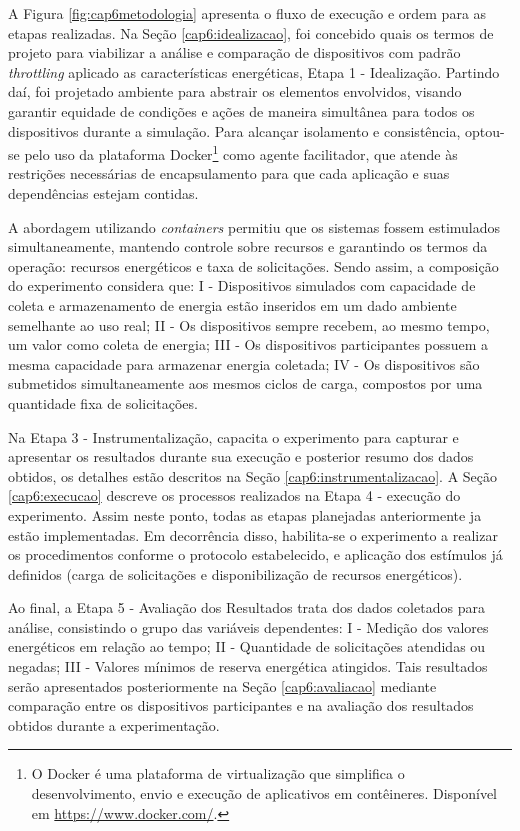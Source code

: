 A Figura \ref{fig:cap6metodologia} apresenta o fluxo de execução e ordem para as etapas realizadas. Na Seção \ref{cap6:idealizacao}, foi concebido quais os termos de projeto para viabilizar a análise e comparação de dispositivos com padrão \textit{throttling} aplicado as características energéticas, Etapa 1 - Idealização. Partindo daí, foi projetado ambiente para abstrair os elementos envolvidos, visando garantir equidade de condições e ações de maneira simultânea para todos os dispositivos durante a simulação. Para alcançar isolamento e consistência, optou-se pelo uso da plataforma Docker\footnote{O Docker é uma plataforma de virtualização que simplifica o desenvolvimento, envio e execução de aplicativos em contêineres. Disponível em \url{https://www.docker.com/}.} como agente facilitador, que atende às restrições necessárias de encapsulamento para que cada aplicação e suas dependências estejam contidas. 

A abordagem utilizando  \textit{containers} permitiu que os sistemas fossem estimulados simultaneamente, mantendo controle sobre recursos e garantindo os termos da operação: recursos energéticos e taxa de solicitações. Sendo assim, a composição do experimento considera que:  I - Dispositivos simulados com capacidade de coleta e armazenamento de energia estão inseridos em um dado ambiente semelhante ao uso real; II - Os dispositivos sempre recebem, ao mesmo tempo, um valor como coleta de energia; III - Os dispositivos participantes possuem a mesma capacidade para armazenar energia coletada; IV - Os dispositivos são submetidos simultaneamente aos mesmos ciclos de carga, compostos por uma quantidade fixa de solicitações.

Na Etapa 3 - Instrumentalização, capacita o experimento para capturar e apresentar os resultados durante sua execução e posterior resumo dos dados obtidos, os detalhes estão descritos na Seção \ref{cap6:instrumentalizacao}. A Seção \ref{cap6:execucao} descreve os processos realizados na Etapa 4 - execução do experimento. Assim neste ponto, todas as etapas planejadas anteriormente ja estão implementadas. Em decorrência disso, habilita-se o experimento a realizar os procedimentos conforme o protocolo estabelecido, e aplicação dos estímulos já definidos (carga de solicitações e disponibilização de recursos energéticos).

Ao final, a Etapa 5 - Avaliação dos Resultados trata dos dados coletados para análise,
consistindo o grupo das variáveis dependentes: I - Medição dos valores energéticos em relação ao tempo; II - Quantidade de solicitações atendidas ou negadas; III - Valores mínimos de reserva energética atingidos. Tais resultados serão apresentados posteriormente na Seção \ref{cap6:avaliacao} mediante comparação entre os dispositivos participantes e na avaliação dos resultados obtidos durante a experimentação.

